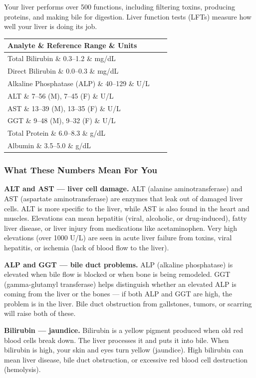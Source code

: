 Your liver performs over 500 functions, including filtering toxins, producing proteins, and making bile for digestion. Liver function tests (LFTs) measure how well your liver is doing its job.

\begin{longtable}{@{}lll@{}}
\toprule
\textbf{Analyte} \& \textbf{Reference Range} \& \textbf{Units} \\
\midrule
Total Bilirubin \& 0.3--1.2 \& mg/dL \\
Direct Bilirubin \& 0.0--0.3 \& mg/dL \\
Alkaline Phosphatase (ALP) \& 40--129 \& U/L \\
ALT \& 7--56 (M), 7--45 (F) \& U/L \\
AST \& 13--39 (M), 13--35 (F) \& U/L \\
GGT \& 9--48 (M), 9--32 (F) \& U/L \\
Total Protein \& 6.0--8.3 \& g/dL \\
Albumin \& 3.5--5.0 \& g/dL \\
\bottomrule
\end{longtable}

\subsubsection{What These Numbers Mean For You}

\textbf{ALT and AST --- liver cell damage.} ALT (alanine aminotransferase) and AST (aspartate aminotransferase) are enzymes that leak out of damaged liver cells. ALT is more specific to the liver, while AST is also found in the heart and muscles. Elevations can mean hepatitis (viral, alcoholic, or drug-induced), fatty liver disease, or liver injury from medications like acetaminophen. Very high elevations (over 1000 U/L) are seen in acute liver failure from toxins, viral hepatitis, or ischemia (lack of blood flow to the liver).

\textbf{ALP and GGT --- bile duct problems.} ALP (alkaline phosphatase) is elevated when bile flow is blocked or when bone is being remodeled. GGT (gamma-glutamyl transferase) helps distinguish whether an elevated ALP is coming from the liver or the bones --- if both ALP and GGT are high, the problem is in the liver. Bile duct obstruction from gallstones, tumors, or scarring will raise both of these.

\textbf{Bilirubin --- jaundice.} Bilirubin is a yellow pigment produced when old red blood cells break down. The liver processes it and puts it into bile. When bilirubin is high, your skin and eyes turn yellow (jaundice). High bilirubin can mean liver disease, bile duct obstruction, or excessive red blood cell destruction (hemolysis).

